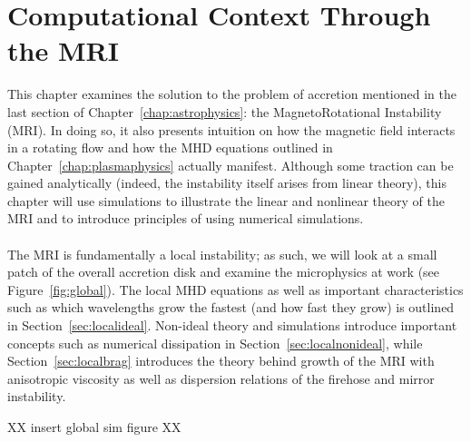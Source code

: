 \chapter{Computational Context Through the MRI} \label{chap:compMRI}
This chapter examines the solution to the problem of accretion mentioned in the last section of Chapter~\ref{chap:astrophysics}: the MagnetoRotational Instability (MRI). In doing so, it also presents intuition on how the magnetic field interacts in a rotating flow and how the MHD equations outlined in Chapter~\ref{chap:plasmaphysics} actually manifest. Although some traction can be gained analytically (indeed, the instability itself arises from linear theory), this chapter will use simulations to illustrate the linear and nonlinear theory of the MRI and to introduce principles of using numerical simulations. \\
\\
The MRI is fundamentally a local instability; as such, we will look at a small patch of the overall accretion disk and examine the microphysics at work (see Figure~\ref{fig:global}). The local MHD equations as well as important characteristics such as which wavelengths grow the fastest (and how fast they grow) is outlined in Section~\ref{sec:localideal}. Non-ideal theory and simulations introduce important concepts such as numerical dissipation in Section~\ref{sec:localnonideal}, while Section~\ref{sec:localbrag} introduces the theory behind growth of the MRI with anisotropic viscosity as well as dispersion relations of the firehose and mirror instability. 

XX insert global sim figure XX 


